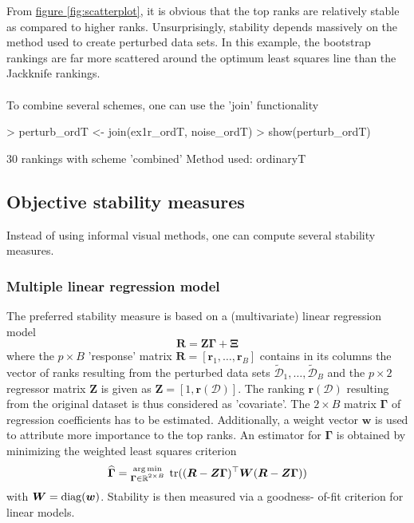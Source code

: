 From \hyperref[fig:scatterplot]{figure }{\ref{fig:scatterplot}}, it is obvious that
the top ranks are relatively stable as compared to higher ranks. Unsurprisingly, stability
depends massively on the method used to create perturbed data sets. In
this example, the bootstrap rankings are far more scattered around the optimum least
squares line than the Jackknife rankings.\\
\\
To combine several schemes, one can use the 'join' functionality
\begin{Schunk}
\begin{Sinput}
> perturb_ordT <- join(ex1r_ordT, noise_ordT)
> show(perturb_ordT)
\end{Sinput}
\begin{Soutput}
30 rankings with scheme 'combined' 
Method used: ordinaryT
\end{Soutput}
\end{Schunk}

\subsection{Objective stability measures}
Instead of using informal visual methods, one can compute several
stability measures.
\subsubsection{Multiple linear regression model}
The preferred stability measure is based on
a (multivariate) linear regression model
\begin{equation*}
\bm{R} = \bm{Z} \bm{\Gamma} + \bm{\Xi}
\end{equation*}
where the $p\times B$ 'response' matrix $\bm{R} = [\bm{r}_1,\ldots,\bm{r}_B]$
contains in its columns the vector of ranks resulting from
the perturbed data sets $\widetilde{\mathcal{D}}_1,\ldots,\widetilde{\mathcal{D}}_B$ and
the $p\times 2$ regressor matrix $\bm{Z}$ is given as $\bm{Z}=[1, \bm{r}(\mathcal{D})]$.
The ranking $\bm{r}(\mathcal{D})$ resulting from the original dataset is thus considered
as 'covariate'. The $2\times B$ matrix  $\bm{\Gamma}$ of regression coefficients
has to be estimated.
Additionally, a weight vector $\bm{w}$ is used to attribute more importance
to the top ranks. An estimator for $\bm{\Gamma}$ is obtained by minimizing
the weighted least squares criterion
\begin{equation*}
\widehat{\bm{\Gamma}} = \substack{\arg \min \\ \tiny \bm{\Gamma} \in {\mathbb R}^{2 \times B}} \; \operatorname*{tr}((\bm{R} - \bm{Z} \bm{\Gamma})^{\top} \bm{W} (\bm{R} - \bm{Z} \bm{\Gamma}))
\end{equation*}
with $\bm{W}=\operatorname*{diag}(\bm{w})$. Stability is then measured via a goodness-
of-fit criterion for linear models.

